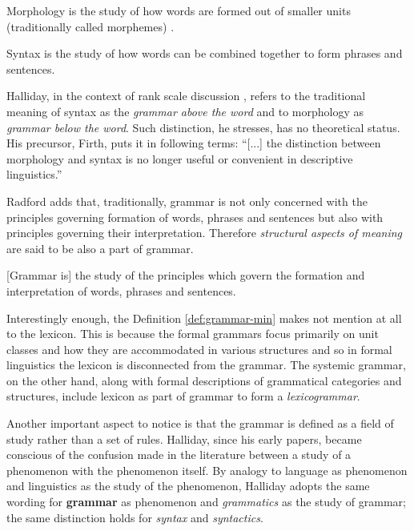 \begin{definition}\label{def:morphology-min}
Morphology is the study of how words are formed out of smaller units (traditionally called morphemes) \citep[p.1]{Radford1997}.
\end{definition}

\begin{definition}\label{def:syntax-min}
Syntax is the study of how words can be combined together to form phrases and sentences. \citep[p.1]{Radford1997}
\end{definition}

Halliday, in the context of rank scale discussion \citep[p. 51]{Halliday2002}, refers to the traditional meaning of syntax as the \textit{grammar above the word} and to morphology as \textit{grammar below the word}. Such distinction, he stresses, has no theoretical status. His precursor, Firth, puts it in following terms: ``[...] the distinction between morphology and syntax is no longer useful or convenient in descriptive linguistics.'' \citep[p.14]{Firth1957}

Radford adds that, traditionally, grammar is not only concerned with the principles governing formation of words, phrases and sentences but also with principles governing their interpretation. Therefore \textit{structural aspects of meaning} are said to be also a part of grammar. 

\begin{definition}\label{def:grammar-min}
[Grammar is] the study of the principles which govern the formation and interpretation of words, phrases and sentences. \citep[p.1]{Radford1997}
\end{definition}

Interestingly enough, the Definition \ref{def:grammar-min} makes not mention at all to the lexicon. This is because the formal grammars focus primarily on unit classes and how they are accommodated in various structures and so in formal linguistics the lexicon is disconnected from the grammar. The systemic grammar, on the other hand, along with formal descriptions of grammatical categories and structures, include lexicon as part of grammar to form a \textit{lexicogrammar}.

Another important aspect to notice is that the grammar is defined as a field of study rather than a set of rules. Halliday, since his early papers, became conscious of the confusion made in the literature between a study of a phenomenon with the phenomenon itself. By analogy to language as phenomenon and linguistics as the study of the phenomenon, Halliday adopts the same wording for \textbf{grammar} as phenomenon and \textit{grammatics} as the study of grammar; the same distinction holds for \textit{syntax} and \textit{syntactics}.

